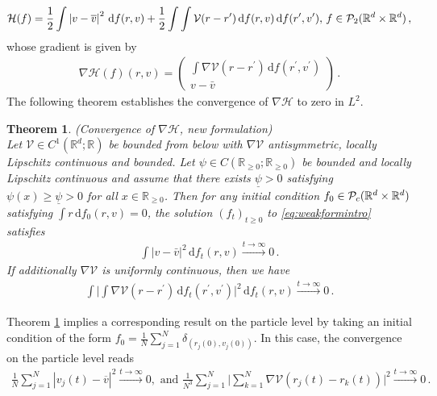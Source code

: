 \documentclass[11pt]{article}
\newtheorem{theorem}{Theorem}[section]
\newcommand{\R}[0]{\mathbb R}
\newcommand{\masssum}[2]{ \frac{1}{#2} \sum_{#1 = 1}^{#2}  }
\newcommand{\abs}[1]{\left| #1 \right|}
\newcommand{\Pp}[1]{
    \ifx #1\infty
        \mathcal{P}_{c}
    \else 
        \mathcal{P}_{#1}
    \fi 
}
\newcommand{\msolinit}[1]{f_0(#1)}
\newcommand{\msolt}[2]{f_{#1}(#2)}
\begin{document}
\begin{bibunit}[unsrtnat]
\begin{align*}
    \mathcal{H}(f) = \frac{1}{2} \int \abs{v-\overline{v}}^2 \, \mathrm{d}f(r,v) + \frac{1}{2} \int \int \mathcal{V}(r-r^\prime) \, \mathrm{d}f(r,v) \, \mathrm{d}f(r^\prime, v^\prime), \, f \in \Pp{2}(\R^d \times \R^d) \, ,
\end{align*}
whose gradient is given by 
\begin{align*}
        \nabla \mathcal{H}(f)(r,v) = \begin{pmatrix}
            \int \nabla \mathcal{V}(r-r^\prime) \, \mathrm{d} f(r^\prime, v^\prime) \\ 
            v - \bar{v}
        \end{pmatrix} \, .
\end{align*}
The following theorem establishes the convergence of $\nabla \mathcal{H}$ to zero in $L^2$.
\begin{theorem}(Convergence of $\nabla \mathcal{H}$, new formulation)\label{thm:gradHconvergence} \\ 
     Let $\mathcal{V} \in C^{1}(\R^d; \R)$ be bounded from below with $\nabla \mathcal{V}$ antisymmetric, locally Lipschitz continuous and bounded. Let $\psi \in C(\R_{\geq 0}; \R_{\geq 0})$ be bounded and locally Lipschitz continuous and assume that there exists $\underline{\psi} > 0$ satisfying $\psi(x) \geq \underline{\psi} > 0$ for all $x \in \R_{\geq 0}$. Then for any initial condition $f_0 \in \Pp{\infty}(\R^d \times \R^d)$ satisfying $\int r \, \mathrm{d} \msolinit{r,v} = 0$, the solution $(f_t)_{t \geq 0}$ to \eqref{eq:weakformintro} satisfies
    \begin{align*}
        \int \abs{v-\bar{v}}^2 \, \mathrm{d} \msolt{t}{r,v} \stackrel{t \to \infty}{\to }0 \, .
    \end{align*}
    If additionally $\nabla \mathcal{V}$ is uniformly continuous, then we have 
    \begin{align}
        \int  \Big| \int \nabla \mathcal{V}(r-r^\prime) \, \mathrm{d} \msolt{t}{r^\prime,v^\prime} \Big|^2 \, \mathrm{d} \msolt{t}{r,v} \stackrel{t \to \infty}{\to } 0 \, . \label{eq:Forceconvergence}
    \end{align}
\end{theorem}
Theorem \ref{thm:gradHconvergence} implies a corresponding result on the particle level by taking an initial condition of the form $f_0 = \masssum{j}{N} \delta_{(r_j(0), v_j(0))}$. In this case, the convergence on the  particle level reads 
\begin{align*}
    \masssum{j}{N} \abs{v_j(t) - \overline{v}}^2 \stackrel{t \to \infty}{\to} 0, \text{ and } \frac{1}{N^3}  \sum_{j=1}^N \Big|\sum_{k=1}^N \nabla \mathcal{V}(r_j(t) - r_k(t) ) \Big|^2 \stackrel{t \to \infty}{\to} 0 \, .

\end{align*}
\end{bibunit}
\end{document}
